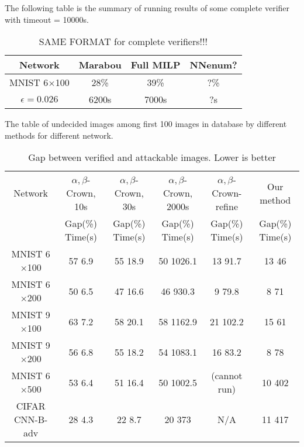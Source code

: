 \vspace*{4ex}


The following table is the summary of running results of some complete verifier with timeout = 10000s. 

\begin{table}
	\centering
	\caption{SAME FORMAT for complete verifiers!!!}
	\label{table_complete}
	\begin{tabular}{||c||c|c|c||}
		\hline
		Network &  Marabou  & Full MILP & NNenum? \\ \hline
		MNIST 6$\times$100 & 28\% & 39\% & ?\%   \\ \hline
		$\epsilon = 0.026$ & 6200s & 7000s
		&  ?s  \\  \hline
	\end{tabular}
\end{table}


\vspace*{4ex}

The table of undecided images among first 100 images in database by different methods for different network.


\begin{table}
	\centering
	\caption{Gap between verified and attackable images. Lower is better}
	\label{table_undecided}
	\begin{tabular}{|c|c|c|c|c|c|}
		\hline
		Network & $\alpha,\beta$-Crown, 10s & $\alpha,\beta$-Crown, 30s & $\alpha,\beta$-Crown, 2000s & $\alpha,\beta$-Crown-refine & Our method \\ 
		& Gap(\%) \hfill Time(s) & Gap(\%) \hfill Time(s) & Gap(\%) \hfill Time(s) & Gap(\%) \hfill Time(s) & Gap(\%) \hfill Time(s)\\ \hline
		MNIST 6$\times$100 & 57 \hfill 6.9 & 55 \hfill 18.9 & 50 \hfill 1026.1 & 13 \hfill 91.7 & 13 \hfill 46 \\ \hline
		MNIST 6$\times$200 & 50 \hfill 6.5 & 47 \hfill 16.6 & 46 \hfill 930.3 & 9 \hfill 79.8 & 8 \hfill 71 \\ \hline
		MNIST 9$\times$100 & 63 \hfill 7.2 & 58 \hfill 20.1 & 58 \hfill 1162.9 & 21 \hfill 102.2 & 15 \hfill 61 \\ \hline
		MNIST 9$\times$200 & 56 \hfill 6.8 & 55 \hfill 18.2 & 54 \hfill 1083.1 & 16 \hfill 83.2 & 8 \hfill 78 \\ \hline
		MNIST 6$\times$500 & 53 \hfill 6.4 & 51 \hfill 16.4 & 50 \hfill 1002.5 & (cannot run) & 10 \hfill 402 \\ \hline
		CIFAR CNN-B-adv & 28 \hfill 4.3 & 22 \hfill 8.7 & 20 \hfill 373 & N/A & 11 \hfill 417 \\ \hline
	\end{tabular}
\end{table}